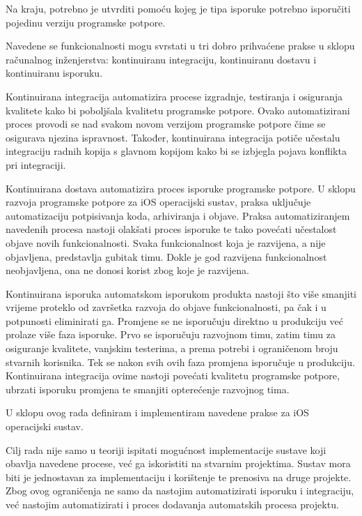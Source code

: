 \documentclass[times, utf8, diplomski, numeric]{fer}
\begin{document}
Na kraju, potrebno je utvrditi pomoću kojeg je tipa isporuke potrebno isporučiti pojedinu verziju programske potpore.

Navedene se funkcionalnosti mogu svrstati u tri dobro prihvaćene prakse u sklopu računalnog inženjerstva: kontinuiranu integraciju, kontinuiranu dostavu i kontinuiranu isporuku.

Kontinuirana integracija automatizira procese izgradnje, testiranja i osiguranja kvalitete kako bi poboljšala kvalitetu programske potpore. Ovako automatizirani proces provodi se nad svakom novom verzijom programske potpore čime se osigurava njezina ispravnost. Također, kontinuirana integracija potiče učestalu integraciju radnih kopija s glavnom kopijom kako bi se izbjegla pojava konflikta pri integraciji.

Kontinuirana dostava automatizira proces isporuke programske potpore. U sklopu razvoja programske potpore za iOS operacijski sustav, praksa uključuje automatizaciju potpisivanja koda, arhiviranja i objave. Praksa automatiziranjem navedenih procesa nastoji olakšati proces isporuke te tako povećati učestalost objave novih funkcionalnosti. Svaka funkcionalnost koja je razvijena, a nije objavljena, predstavlja gubitak timu. Dokle je god razvijena funkcionalnost neobjavljena, ona ne donosi korist zbog koje je razvijena.

Kontinuirana isporuka automatskom isporukom produkta nastoji što više smanjiti vrijeme proteklo od završetka razvoja do objave funkcionalnosti, pa čak i u potpunosti eliminirati ga. Promjene se ne isporučuju direktno u produkciju već prolaze više faza isporuke. Prvo se isporučuju razvojnom timu, zatim timu za osiguranje kvalitete, vanjskim testerima, a prema potrebi i ograničenom broju stvarnih korisnika. Tek se nakon svih ovih faza promjena isporučuje u produkciju. Kontinuirana integracija ovime nastoji povećati kvalitetu programske potpore, ubrzati isporuku promjena te smanjiti opterećenje razvojnog tima.

U sklopu ovog rada definiram i implementiram navedene prakse za iOS operacijski sustav.

Cilj rada nije samo u teoriji ispitati mogućnost implementacije sustave koji obavlja navedene procese, već ga iskoristiti na stvarnim projektima. Sustav mora biti je jednostavan za implementaciju i korištenje te prenosiva na druge projekte. Zbog ovog ograničenja ne samo da nastojim automatizirati isporuku i integraciju, već nastojim automatizirati i proces dodavanja automatskih procesa projektu.
\end{document}
